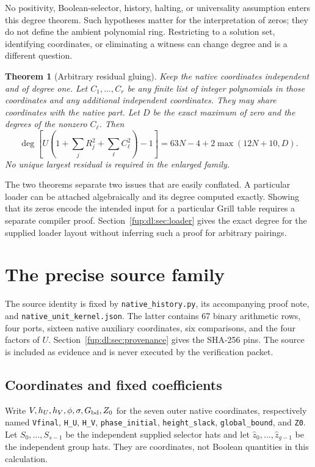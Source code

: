 \documentclass[11pt,letterpaper]{article}
\newtheorem{theorem}{Theorem}[section]
\theoremstyle{definition}\newtheorem{definition}[theorem]{Definition}
\theoremstyle{remark}\newtheorem{remark}[theorem]{Remark}
\newcommand{\fnameB}[1]{{\small\nolinkurl{#1}}}
\begin{document}
No positivity, Boolean-selector, history, halting, or universality assumption enters this degree theorem. Such hypotheses matter for the interpretation of zeros; they do not define the ambient polynomial ring. Restricting to a solution set, identifying coordinates, or eliminating a witness can change degree and is a different question.

\begin{theorem}[Arbitrary residual gluing]\label{fup:dl:thm:glue}
Keep the native coordinates independent and of degree one. Let $C_1,\ldots,C_r$ be any finite list of integer polynomials in those coordinates and any additional independent coordinates. They may share coordinates with the native part. Let $D$ be the exact maximum of zero and the degrees of the nonzero $C_\ell$. Then
\begin{equation}\label{fup:dl:eq:glue}
 \deg\left[U\left(1+\sum_jR_j^2+\sum_\ell C_\ell^2\right)-1\right]
 =63N-4+2\max(12N+10,D).
\end{equation}
No unique largest residual is required in the enlarged family.
\end{theorem}

The two theorems separate two issues that are easily conflated. A particular loader can be attached algebraically and its degree computed exactly. Showing that its zeros encode the intended input for a particular Grill table requires a separate compiler proof. Section~\ref{fup:dl:sec:loader} gives the exact degree for the supplied loader layout without inferring such a proof for arbitrary pairings.

\section{The precise source family}\label{fup:dl:sec:source}
The source identity is fixed by \fnameB{native_history.py}, its accompanying proof note, and \fnameB{native_unit_kernel.json}. The latter contains 67 binary arithmetic rows, four ports, sixteen native auxiliary coordinates, six comparisons, and the four factors of $U$. Section~\ref{fup:dl:sec:provenance} gives the SHA-256 pins. The source is included as evidence and is never executed by the verification packet.

\subsection{Coordinates and fixed coefficients}
Write $V,h_U,h_V,\phi,\sigma,G_{\rm bd},Z_0$ for the seven outer native coordinates, respectively named \fnameB{Vfinal}, \fnameB{H_U}, \fnameB{H_V}, \fnameB{phase_initial}, \fnameB{height_slack}, \fnameB{global_bound}, and \fnameB{Z0}. Let $S_0,\ldots,S_{s-1}$ be the independent supplied selector hats and let $\widehat z_0,\ldots,\widehat z_{g-1}$ be the independent group hats. They are coordinates, not Boolean quantities in this calculation.
\end{document}
